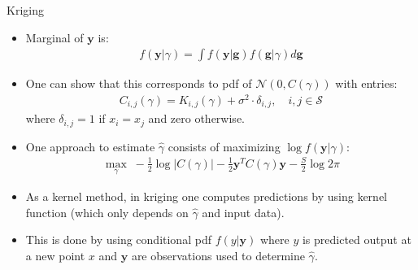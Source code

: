 \documentclass[9pt]{beamer}
\begin{document}
\begin{frame}{Kriging}

\begin{itemize}
   \setlength{\itemsep}{10pt}
\item Marginal of $\mathbf{y}$ is:
\begin{align*}
f(\mathbf{y}|\gamma)=\int f(\mathbf{y}|\mathbf{g})f(\mathbf{g}|\gamma)d\mathbf{g}
\end{align*}
\item One can show that this corresponds to pdf of $\mathcal{N}(0,C(\gamma))$ with entries:
\begin{align*}
C_{i,j}(\gamma)=K_{i,j}(\gamma)+\sigma^2\cdot  \delta_{i,j},\quad i,j\in \mathcal{S}
\end{align*}
where $\delta_{i,j}=1$ if $x_i=x_j$ and zero otherwise. 

\item One approach to estimate $\hat{\gamma}$ consists of maximizing $\log f(\mathbf{y}|\gamma)$:
\begin{align*}
\max_\gamma \; -\frac{1}{2}\log|C(\gamma)|-\frac{1}{2}\mathbf{y}^TC(\gamma)\mathbf{y}-\frac{S}{2}\log 2\pi
\end{align*}

\item As a kernel method, in kriging one computes predictions by using kernel function (which only depends on $\hat{\gamma}$ and input data).

\item This is done by using conditional pdf $f(y|\mathbf{y})$  where $y$ is predicted output at a new point $x$ and $\mathbf{y}$ are observations used to determine $\hat{\gamma}$.

\end{itemize}


\end{frame}

\end{document}
